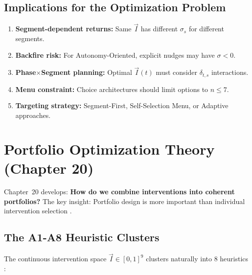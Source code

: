 \subsection{Implications for the Optimization Problem}

\begin{enumerate}[nosep]
\item \textbf{Segment-dependent returns:} Same $\vec{I}$ has different $\sigma_s$ for different segments.
\item \textbf{Backfire risk:} For Autonomy-Oriented, explicit nudges may have $\sigma < 0$.
\item \textbf{Phase$\times$Segment planning:} Optimal $\vec{I}(t)$ must consider $\delta_{t,s}$ interactions.
\item \textbf{Menu constraint:} Choice architectures should limit options to $n \leq 7$.
\item \textbf{Targeting strategy:} Segment-First, Self-Selection Menu, or Adaptive approaches.
\end{enumerate}

\section{Portfolio Optimization Theory (Chapter 20)}
\label{sec:mp-portfolio}

Chapter~20 develops: \textbf{How do we combine interventions into coherent portfolios?} The key insight: Portfolio design is more important than individual intervention selection \citep{iyengar2000choice, benartzi2001naive, thaler2008}.

\subsection{The A1-A8 Heuristic Clusters}

The continuous intervention space $\vec{I} \in [0,1]^9$ clusters naturally into 8 heuristics \citep{szaszi2018systematic, johnson2012beyond}:

